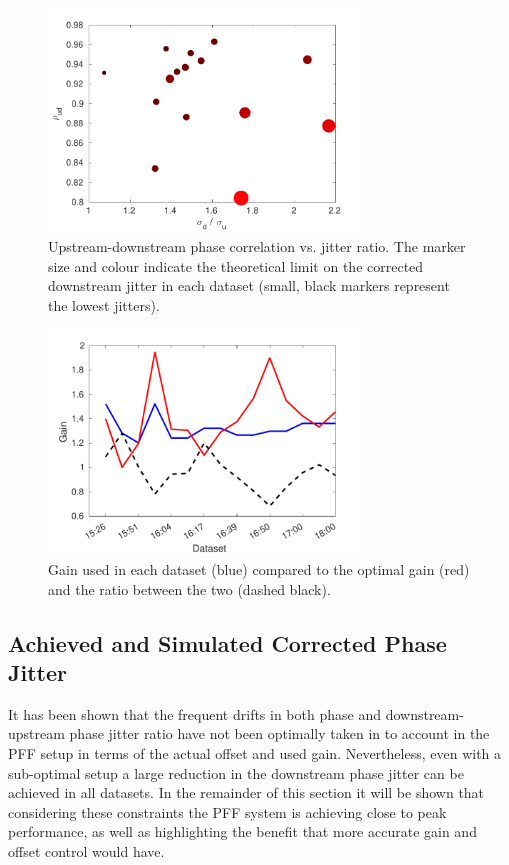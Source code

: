 \begin{figure}
  \centering
  \includegraphics[width=0.75\textwidth]{Figures/feedforward/longFF_corrVsJitRat}
  \caption{Upstream-downstream phase correlation vs. jitter ratio. The marker size and colour indicate the theoretical limit on the corrected downstream jitter in each dataset (small, black markers represent the lowest jitters).}
  \label{f:longFF_corrVsJitRat}
\end{figure}

\begin{figure}
  \centering
  \includegraphics[width=0.75\textwidth]{Figures/feedforward/longFF_gain}
  \caption{Gain used in each dataset (blue) compared to the optimal gain (red) and the ratio between the two (dashed black).}
  \label{f:longFF_gain}
\end{figure}



\subsection{Achieved and Simulated Corrected Phase Jitter}
\label{ss:longFF_singleResults}

It has been shown that the frequent drifts in both phase and downstream-upstream phase jitter ratio have not been optimally taken in to account in the PFF setup in terms of the actual offset and used gain. Nevertheless, even with a sub-optimal setup a large reduction in the downstream phase jitter can be achieved in all datasets. In the remainder of this section it will be shown that considering these constraints the PFF system is achieving close to peak performance, as well as highlighting the benefit that more accurate gain and offset control would have.

